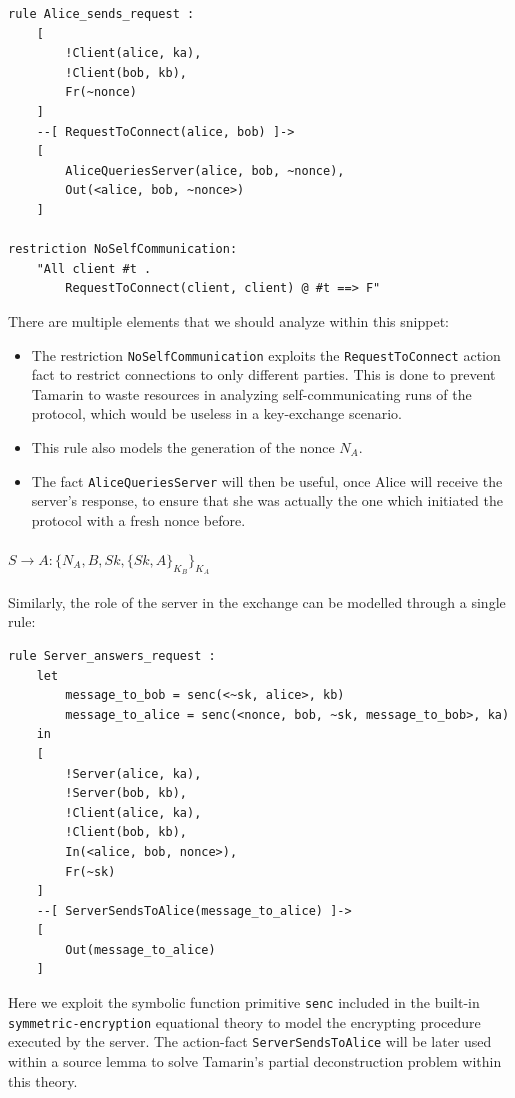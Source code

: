 \documentclass[fleqn,10pt]{SelfArx} %
\begin{document}
\begin{lstlisting}[language=Tamarin]
rule Alice_sends_request :
    [
        !Client(alice, ka),
        !Client(bob, kb),
        Fr(~nonce)
    ]
    --[ RequestToConnect(alice, bob) ]->
    [
        AliceQueriesServer(alice, bob, ~nonce),
        Out(<alice, bob, ~nonce>)
    ]

restriction NoSelfCommunication:
    "All client #t .
        RequestToConnect(client, client) @ #t ==> F"
\end{lstlisting}

There are multiple elements that we should analyze within this snippet:

\begin{itemize}
    \item The restriction \lstinline|NoSelfCommunication| exploits the \lstinline|RequestToConnect| action fact to restrict connections to only different parties. This is done to prevent Tamarin to waste resources in analyzing self-communicating runs of the protocol, which would be useless in a key-exchange scenario.
    \item This rule also models the generation of the nonce $N_A$.
    \item The fact \lstinline|AliceQueriesServer| will then be useful, once Alice will receive the server's response, to ensure that she was actually the one which initiated the protocol with a fresh nonce before.
\end{itemize}

\paragraph{$S \to A: \{N_A, B, Sk, \{Sk, A\}_{K_B} \}_{K_A}$}

Similarly, the role of the server in the exchange can be modelled through a single rule:

\begin{lstlisting}[language=Tamarin]
rule Server_answers_request :
    let
        message_to_bob = senc(<~sk, alice>, kb)
        message_to_alice = senc(<nonce, bob, ~sk, message_to_bob>, ka)
    in
    [
        !Server(alice, ka),
        !Server(bob, kb),
        !Client(alice, ka),
        !Client(bob, kb),
        In(<alice, bob, nonce>),
        Fr(~sk)
    ]
    --[ ServerSendsToAlice(message_to_alice) ]->
    [
        Out(message_to_alice)
    ]
\end{lstlisting}

Here we exploit the symbolic function primitive \lstinline|senc| included in the built-in \lstinline|symmetric-encryption| equational theory to model the encrypting procedure executed by the server. The action-fact \lstinline|ServerSendsToAlice| will be later used within a source lemma to solve Tamarin's partial deconstruction problem within this theory.
\end{document}
